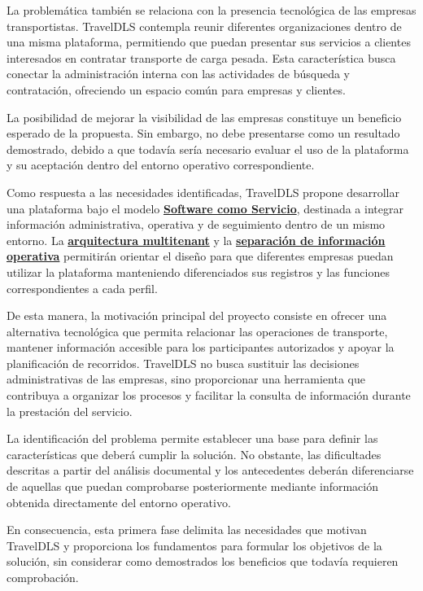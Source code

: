 La problemática también se relaciona con la presencia tecnológica de las empresas transportistas. TravelDLS contempla reunir diferentes organizaciones dentro de una misma plataforma, permitiendo que puedan presentar sus servicios a clientes interesados en contratar transporte de carga pesada. Esta característica busca conectar la administración interna con las actividades de búsqueda y contratación, ofreciendo un espacio común para empresas y clientes.

La posibilidad de mejorar la visibilidad de las empresas constituye un beneficio esperado de la propuesta. Sin embargo, no debe presentarse como un resultado demostrado, debido a que todavía sería necesario evaluar el uso de la plataforma y su aceptación dentro del entorno operativo correspondiente.

Como respuesta a las necesidades identificadas, TravelDLS propone desarrollar una plataforma bajo el modelo \textbf{\hyperlink{concepto-saas}{Software como Servicio}}, destinada a integrar información administrativa, operativa y de seguimiento dentro de un mismo entorno. La \textbf{\hyperlink{concepto-multitenant}{arquitectura multitenant}} y la \textbf{\hyperlink{concepto-separacion}{separación de información operativa}} permitirán orientar el diseño para que diferentes empresas puedan utilizar la plataforma manteniendo diferenciados sus registros y las funciones correspondientes a cada perfil.

De esta manera, la motivación principal del proyecto consiste en ofrecer una alternativa tecnológica que permita relacionar las operaciones de transporte, mantener información accesible para los participantes autorizados y apoyar la planificación de recorridos. TravelDLS no busca sustituir las decisiones administrativas de las empresas, sino proporcionar una herramienta que contribuya a organizar los procesos y facilitar la consulta de información durante la prestación del servicio.

La identificación del problema permite establecer una base para definir las características que deberá cumplir la solución. No obstante, las dificultades descritas a partir del análisis documental y los antecedentes deberán diferenciarse de aquellas que puedan comprobarse posteriormente mediante información obtenida directamente del entorno operativo.

En consecuencia, esta primera fase delimita las necesidades que motivan TravelDLS y proporciona los fundamentos para formular los objetivos de la solución, sin considerar como demostrados los beneficios que todavía requieren comprobación.


